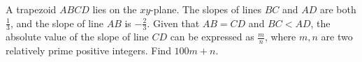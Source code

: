A trapezoid $ABCD$ lies on the $xy$-plane. The slopes of lines $BC$ and $AD$ are both $\frac 13$, and the slope of line $AB$ is $-\frac 23$. Given that $AB=CD$ and $BC< AD$, the absolute value of the slope of line $CD$ can be expressed as $\frac mn$, where $m,n$ are two relatively prime positive integers. Find $100m+n$.
